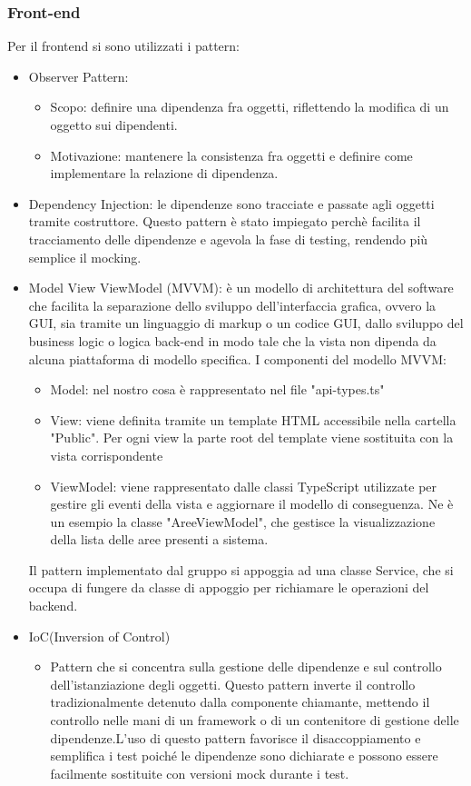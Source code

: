 \documentclass[12pt]{article}
\begin{document}
\subsubsection{Front-end}
Per il frontend si sono utilizzati i pattern:
\begin{itemize}
	\item Observer Pattern:
	\begin{itemize}
		\item Scopo: definire una dipendenza fra oggetti, riflettendo la modifica di un oggetto sui dipendenti.
		\item Motivazione: mantenere la consistenza fra oggetti e definire come implementare la relazione di dipendenza.
	\end{itemize}
	\item Dependency Injection: le dipendenze sono tracciate e passate agli oggetti tramite costruttore.
	 Questo pattern è stato impiegato perchè facilita il tracciamento delle dipendenze e agevola la fase di testing, rendendo più semplice il mocking.
	\item Model View ViewModel (MVVM): è un modello di architettura del software che facilita la separazione dello sviluppo dell'interfaccia grafica, ovvero la GUI,
sia tramite un linguaggio di markup o un codice GUI, dallo sviluppo del business logic o logica back-end in modo tale che la vista non dipenda da alcuna piattaforma di modello specifica.
I componenti del modello MVVM:	
	\begin{itemize}
		\item Model: nel nostro cosa è rappresentato nel file "api-types.ts"
		\item View: viene definita tramite un template HTML accessibile nella cartella "Public". Per ogni view la parte root del template viene sostituita con la vista corrispondente
		\item ViewModel: viene rappresentato dalle classi TypeScript utilizzate per gestire gli eventi della vista e aggiornare il modello di conseguenza. Ne è un esempio la classe "AreeViewModel", che gestisce la visualizzazione della lista delle aree presenti a sistema.
	\end{itemize}
Il pattern implementato dal gruppo si appoggia ad una classe Service, che si occupa di fungere da classe di appoggio per richiamare le operazioni del backend.
\item IoC(Inversion of Control)
	\begin{itemize}
		\item Pattern che si concentra sulla gestione delle dipendenze e sul controllo dell'istanziazione degli oggetti. Questo pattern inverte il controllo tradizionalmente detenuto dalla 				componente chiamante, mettendo il controllo nelle mani di un framework o di un contenitore di gestione delle dipendenze.L'uso di questo pattern favorisce il disaccoppiamento e 				semplifica i test poiché le dipendenze sono dichiarate e possono essere facilmente sostituite con versioni mock durante i test.
	\end{itemize}
\end{itemize}
\end{document}

